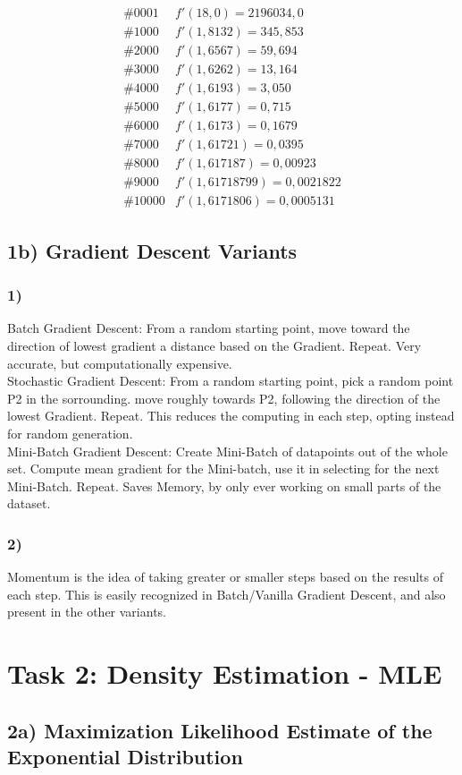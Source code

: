 \documentclass{article}
\begin{document}
		\begin{align*}
			\#0001 & f'(18,0) = 2196034,0\\
			\#1000 & f'( 1,8132) = 345,853\\
			\#2000 & f'( 1,6567) = 59,694\\
			\#3000 & f'( 1,6262) = 13,164\\
			\#4000 & f'( 1,6193) = 3,050\\
			\#5000 & f'( 1,6177) = 0,715\\
			\#6000 & f'( 1,6173) = 0,1679\\
			\#7000 & f'( 1,61721) = 0,0395\\
			\#8000 & f'( 1,617187) = 0,00923\\
			\#9000 & f'( 1,61718799) = 0,0021822\\
			\#10000 & f'(1,6171806) = 0,0005131
		\end{align*}

\subsection{1b) Gradient Descent Variants}
\subsubsection{1)}
	Batch Gradient Descent: From a random starting point, move toward the direction of lowest gradient a distance based on the Gradient. Repeat. Very accurate, but computationally expensive.\\
	Stochastic Gradient Descent: From a random starting point, pick a random point P2 in the sorrounding. move roughly towards P2, following the direction of the lowest Gradient. Repeat. This reduces the computing in each step, opting instead for random generation. \\
	Mini-Batch Gradient Descent: Create Mini-Batch of datapoints out of the whole set. Compute mean gradient for the Mini-batch, use it in selecting for the next Mini-Batch. Repeat. Saves Memory, by only ever working on small parts of the dataset.
	
\subsubsection{2)}
	Momentum is the idea of taking greater or smaller steps based on the results of each step. This is easily recognized in Batch/Vanilla Gradient Descent, and also present in the other variants.
	
\section{Task 2: Density Estimation - MLE}
\subsection{2a) Maximization Likelihood Estimate of the Exponential Distribution}
	
\end{document}
